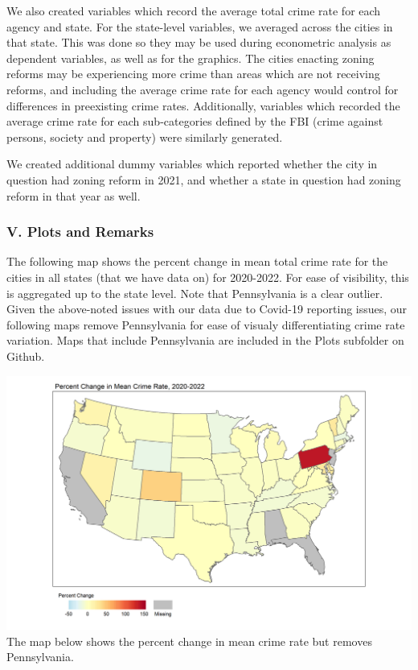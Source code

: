 \documentclass[
  12pt,
]{article}
\begin{document}
We also created variables which record the average total crime rate for
each agency and state. For the state-level variables, we averaged across
the cities in that state. This was done so they may be used during
econometric analysis as dependent variables, as well as for the
graphics. The cities enacting zoning reforms may be experiencing more
crime than areas which are not receiving reforms, and including the
average crime rate for each agency would control for differences in
preexisting crime rates. Additionally, variables which recorded the
average crime rate for each sub-categories defined by the FBI (crime
against persons, society and property) were similarly generated.

We created additional dummy variables which reported whether the city in
question had zoning reform in 2021, and whether a state in question had
zoning reform in that year as well.

\hypertarget{v.-plots-and-remarks}{%
\subsubsection{V. Plots and Remarks}\label{v.-plots-and-remarks}}

The following map shows the percent change in mean total crime rate for
the cities in all states (that we have data on) for 2020-2022. For ease
of visibility, this is aggregated up to the state level. Note that
Pennsylvania is a clear outlier. Given the above-noted issues with our
data due to Covid-19 reporting issues, our following maps remove
Pennsylvania for ease of visualy differentiating crime rate variation.
Maps that include Pennsylvania are included in the Plots subfolder on
Github.

\includegraphics{Plots/States.png} The map below shows the percent
change in mean crime rate but removes Pennsylvania.
\end{document}
